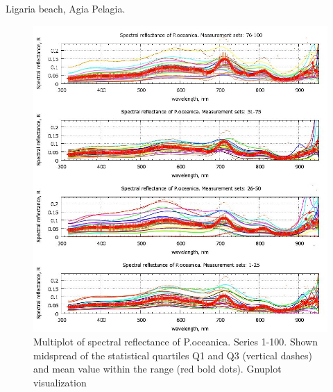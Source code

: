 \documentclass[10pt, a4paper]{article}
\begin{document}
Ligaria beach, Agia Pelagia.
\begin{figure}
\begin{center}
\includegraphics[scale=0.45]{GNU-13.jpg}
\caption{Multiplot of spectral reflectance of P.oceanica. Series 1-100. Shown midspread of the statistical quartiles Q1 and Q3 (vertical dashes) and
mean value within the range (red bold dots). Gnuplot visualization­}
\label{fig:35}
\end{center}
\end{figure}
\end{document}
